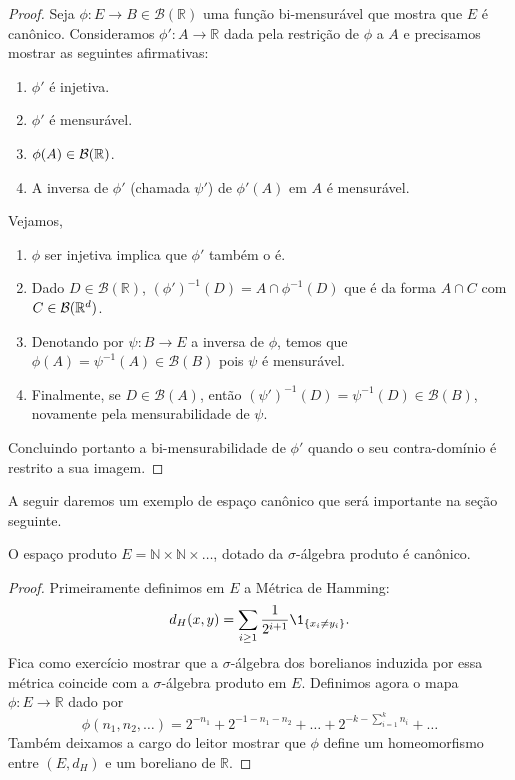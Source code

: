 \begin{topics}
\begin{proof}
  Seja $\phi: E \to B \in \mathcal{B}(\mathbb{R})$ uma função bi-mensurável que mostra que $E$ é canônico.
  Consideramos $\phi': A \to \mathbb{R}$ dada pela restrição de $\phi$ a $A$ e precisamos mostrar as seguintes afirmativas:
  \begin{enumerate}[\quad a)]
  \item $\phi'$ é injetiva.
  \item $\phi'$ é mensurável.
  \item $\phi(A)\in {\ensuremath{\mathcal B}}({\mathbb R})$.
  \item A inversa de $\phi'$ (chamada $\psi'$) de $\phi'(A)$ em $A$ é mensurável.
  \end{enumerate}
  Vejamos,
  \begin{enumerate}[\quad a)]
  \item $\phi$ ser injetiva implica que $\phi'$ também o é.
  \item Dado $D \in \mathcal{B}(\mathbb{R})$, $(\phi')^{-1}(D) = A \cap \phi^{-1}(D)$ que é da forma $A\cap C$ com $C\in {\ensuremath{\mathcal B}}({\mathbb R}^d)$.
  \item Denotando por $\psi: B \to E$ a inversa de $\phi$, temos que $\phi(A) = \psi^{-1}(A) \in \mathcal{B}(B)$ pois $\psi$ é mensurável.
  \item Finalmente, se $D \in \mathcal{B}(A)$, então $(\psi')^{-1}(D) = \psi^{-1}(D) \in \mathcal{B}(B)$, novamente pela mensurabilidade de $\psi$.
  \end{enumerate}
  Concluindo portanto a bi-mensurabilidade de $\phi'$ quando o seu contra-domínio é restrito a sua imagem.
\end{proof}

A seguir daremos um exemplo de espaço canônico que será importante na seção seguinte.

\begin{lemma}
  \label{l:NN_canonico}
  O espaço produto $E = \mathbb{N} \times \mathbb{N} \times \dots$, dotado da $\sigma$-álgebra produto é canônico.
\end{lemma}

\begin{proof}
  Primeiramente definimos em $E$ a Métrica de Hamming:
  \begin{equation}
    \label{e:hamming_distance}
    d_H(x,y) = \sum_{i \geq 1} \frac{1}{2^{i + 1}} \1_{\{x_i \neq y_i\}}.
  \end{equation}
  Fica como exercício mostrar que a $\sigma$-álgebra dos borelianos induzida por essa métrica coincide com a $\sigma$-álgebra produto em $E$.
  Definimos agora o mapa $\phi:E \to \mathbb{R}$ dado por
  \begin{equation}
    \phi(n_1, n_2, \dots) = 2^{-n_1} + 2^{-1 - n_1 - n_2} + \dots + 2^{-k - \sum_{i=1}^k n_i} + \dots
  \end{equation}
  Também deixamos a cargo do leitor mostrar que $\phi$ define um homeomorfismo entre $(E,d_H)$ e um boreliano de $\mathbb{R}$.
\end{proof}


\end{topics}

